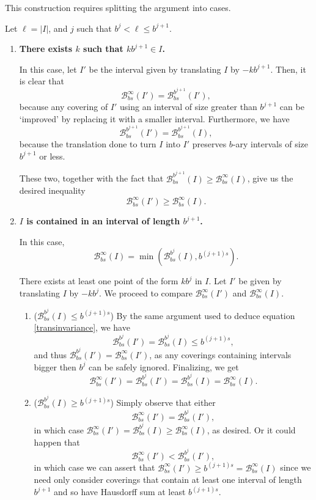 \documentclass[11pt, reqno]{amsart}
\newcommand{\BB}{\mathcal{B}}
\begin{document}
This construction requires splitting the argument into cases.

Let $\ell = \lvert I \rvert$, and $j$ such that $b^j < \ell \leq b^{j+1}$.

\begin{enumerate}[label=\textbf{Case \arabic*:}]

\item \textbf{There exists $k$ such that $k b^{j+1} \in I$.}

In this case, let $I'$ be the interval given by translating $I$ by $-k b^{j+1}$. Then, it is clear that
\[\BB_{bs}^\infty(I') = \BB_{bs}^{b^{j+1}}(I'),\]
because any covering of $I'$ using an interval of size greater than $b^{j+1}$ can be `improved' by replacing it with a smaller interval. Furthermore, we have
\begin{equation}\label{transinvariance}
\BB_{bs}^{b^{j+1}}(I') = \BB_{bs}^{b^{j+1}}(I),
\end{equation}
because the translation done to turn $I$ into $I'$ preserves $b$-ary intervals of size $b^{j+1}$ or less.

These two, together with the fact that $\BB_{bs}^{b^{j+1}}(I) \geq \BB_{bs}^\infty(I)$, give us the desired inequality
\[\BB_{bs}^\infty(I') \geq \BB_{bs}^\infty(I).\]

\item \textbf{$I$ is contained in an interval of length $b^{j+1}$.}

In this case, 
\[\BB_{bs}^\infty(I) = \min(\BB_{bs}^{b^j}(I), b^{(j+1)s}).\]

There exists at least one point of the form $k b^j$ in $I$. Let $I'$ be given by translating $I$ by $-k b^j$. We proceed to compare $\BB_{bs}^\infty(I')$ and $\BB_{bs}^\infty(I)$.

\begin{enumerate}[label=\textbf{Subcase \roman*)}]

\item ($\BB_{bs}^{b^j}(I) \leq b^{(j+1)s}$) By the same argument used to deduce equation \eqref{transinvariance}, we have
\[\BB_{bs}^{b^j}(I') = \BB_{bs}^{b^j}(I) \leq b^{(j+1)s},\]
and thus $\BB_{bs}^{b^j}(I') = \BB_{bs}^\infty(I')$, as any coverings containing intervals bigger then $b^j$ can be safely ignored. Finalizing, we get
\[\BB_{bs}^\infty(I') = \BB_{bs}^{b^j}(I') = \BB_{bs}^{b^j}(I) = \BB_{bs}^\infty(I).\]

\item ($\BB_{bs}^{b^j}(I) \geq b^{(j+1)s}$) Simply observe that either
\[\BB_{bs}^\infty(I') = \BB_{bs}^{b^j}(I'),\]
in which case $\BB_{bs}^\infty(I') = \BB_{bs}^{b^j}(I) \geq \BB_{bs}^\infty(I)$, as desired.
Or it could happen that
\[\BB_{bs}^\infty(I') < \BB_{bs}^{b^j}(I'),\]
in which case we can assert that $\BB_{bs}^\infty(I') \geq b^{(j+1)s} = \BB_{bs}^\infty(I)$ since we need only consider coverings that contain at least one interval of length $b^{j+1}$ and so have Hausdorff sum  at least $b^{(j+1)s}$.
\end{enumerate}
\end{enumerate}
\end{document}
